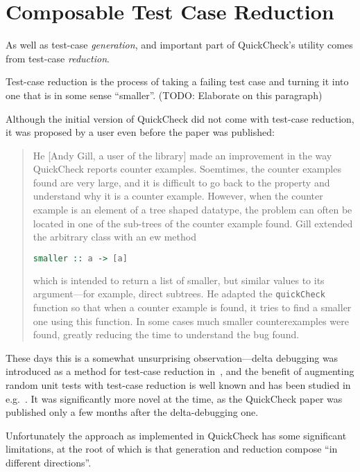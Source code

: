 \chapter{Composable Test Case Reduction}

As well as test-case \emph{generation},
and important part of QuickCheck's utility comes from test-case \emph{reduction}.

Test-case reduction is the process of taking a failing test case and turning it into one that is in some sense ``smaller''.
(TODO: Elaborate on this paragraph)

Although the initial version of QuickCheck did not come with test-case reduction,
it was proposed by a user even before the paper was published:

\begin{quote}
He [Andy Gill, a user of the library] made an improvement in the way QuickCheck reports counter examples.
Soemtimes, the counter examples found are very large,
and it is difficult to go back to the property and understand why it is a counter example.
However,
when the counter example is an element of a tree shaped datatype,
the problem can often be located in one of the sub-trees of the counter example found.
Gill extended the arbitrary class with an ew method

\begin{lstlisting}[language=Haskell]
smaller :: a -> [a]
\end{lstlisting}

which is intended to return a list of smaller, but similar values to its argument---for example, direct subtrees.
He adapted the \texttt{quickCheck} function so that when a counter example is found,
it tries to find a smaller one using this function.
In some cases much smaller counterexamples were found,
greatly reducing the time to understand the bug found.
\end{quote}

These days this is a somewhat unsurprising observation---delta
debugging was introduced as a method for test-case reduction in~\cite{DBLP:journals/tse/ZellerH02},
and the benefit of augmenting random unit tests with test-case reduction is well known and has been studied in e.g.~\cite{DBLP:conf/issre/LeiA05,DBLP:conf/pldi/RegehrCCEEY12}.
It was significantly more novel at the time,
as the QuickCheck paper was published only a few months after the delta-debugging one.

Unfortunately the approach as implemented in QuickCheck has some significant limitations,
at the root of which is that generation and reduction compose ``in different directions''.

